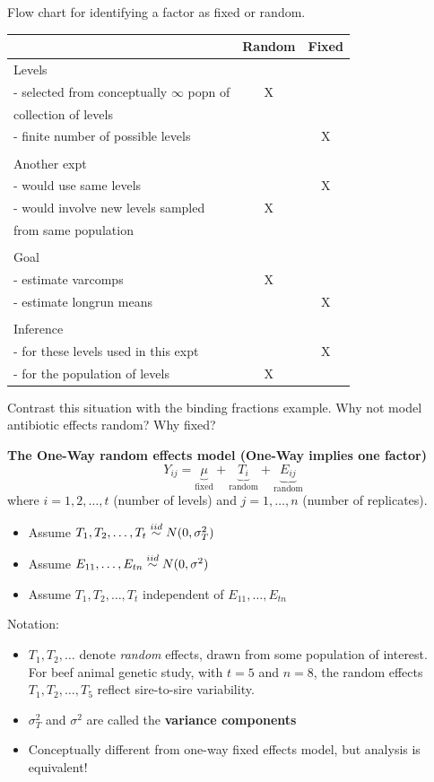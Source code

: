 \begin{center}
Flow chart for identifying a factor as fixed or random.\\
\begin{tabular}{l| c c}
& Random & Fixed \\ \hline
Levels \\
- selected from conceptually $\infty$ popn of & X & \\
collection of levels & & \\
- finite number of possible  levels & & X \\
\\ \hline
Another expt & & \\
- would use same levels & & X \\
- would involve new levels sampled & X & \\
from same population \\
\\ \hline
Goal  & & \\
- estimate varcomps & X & \\
- estimate longrun means & & X\\
\\ \hline
Inference & & \\
- for these levels  used in this expt & & X\\
- for the population of levels & X & \\
\end{tabular}
\end{center}
Contrast this situation with the binding fractions example.  Why not model antibiotic effects random?  Why fixed?%
\\

\newpage

\textbf{The One-Way random effects model (One-Way implies one factor)}
$$ Y_{ij} = \underbrace{\mu}_{\text{fixed}} + \underbrace{T_i}_{\text{random}} + \underbrace{E_{ij}}_{\text{random}}$$
where $i=1,2,\ldots,t$ (number of levels) and $j=1,\ldots,n$ (number of replicates).
\begin{itemize}
\item Assume $T_1,T_2,\ldots,T_t \stackrel{iid}{\sim} N(0,\sigma_T^2)$
\item Assume $E_{11},\ldots,E_{tn} \stackrel{iid}{\sim} N(0,\sigma^2)$
\item Assume $T_1,T_2,\ldots,T_t$ independent of $E_{11},\ldots,E_{tn}$
\end{itemize}
Notation:
\begin{itemize}
\item $T_1,T_2,\ldots$ denote {\em random} effects, drawn from some population of interest. \\For beef animal genetic study, with $t=5$ and $n=8$, the random effects $T_1,T_2,\ldots,T_5$ reflect sire-to-sire variability.  
\item $\sigma_T^2$ and $\sigma^2$ are called the \textbf{variance components}
\item Conceptually different from one-way fixed effects model, but analysis is equivalent!
\end{itemize}

